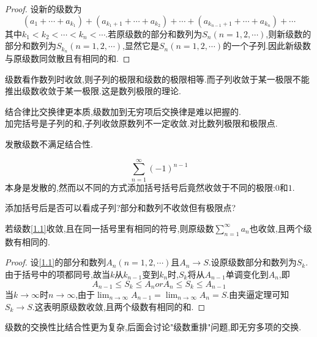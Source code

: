 \begin{proof}
    设新的级数为
    \begin{equation}\label{1.1}
        (a_1+\cdots+a_{k_1})+(a_{k_1+1}+\cdots+a_{k_2})+\cdots+(a_{k_{n-1}+1}+\cdots+a_{k_n})+\cdots
    \end{equation}
    其中$k_1<k_2<\cdots<k_n<\cdots.$若原级数的部分和数列为$S_n(n=1,2,\cdots)$,则新级数的部分和数列为$S_{k_n}(n=1,2,\cdots)$,显然它是$S_n(n=1,2,\cdots)$的一个子列.因此新级数与原级数同敛散且有相同的和.
\end{proof}

\begin{note}
    级数看作数列时收敛,则子列的极限和级数的极限相等.而子列收敛于某一极限不能推出级数收敛于某一极限.这是数列极限的理论.
\end{note}

\begin{remark}
    结合律比交换律更本质,级数加到无穷项后交换律是难以把握的.\\
    加完括号是子列的和,子列收敛原数列不一定收敛.对比数列极限和极限点.
\end{remark}

\begin{remark}
    发散级数不满足结合性.
    \begin{example}
        \[\sum_{n=1}^\infty(-1)^{n-1}\]
        本身是发散的,然而以不同的方式添加括号括号后竟然收敛于不同的极限:$0$和$1$.
    \end{example}
    \begin{note}
        添加括号后是否可以看成子列?部分和数列不收敛但有极限点?
    \end{note}
\end{remark}

\begin{proposition}
    若级数\ref{1.1}收敛,且在同一括号里有相同的符号,则原级数$\sum_{n=1}^\infty a_n$也收敛,且两个级数有相同的.
\end{proposition}

\begin{proof}
    设\ref{1.1}的部分和数列$A_n(n=1,2,\cdots)$且$A_n\to S$.设原级数部分和数列为$S_k$.由于括号中的项都同号,故当$k$从$k_{n-1}$变到$k_n$时,$S_k$将从$A_{n-1}$单调变化到$A_n$,即
    \[A_{n-1}\leqslant S_k\leqslant A_n or A_n\leqslant S_k\leqslant A_{n-1}\]
    当$k\to\infty$时$n\to\infty$,由于$\lim_{n\to\infty}A_{n-1}=\lim_{n\to\infty}A_n=S.$由夹逼定理可知$S_k\to S.$这表明原级数收敛,且两个级数有相同的和.
\end{proof}

级数的交换性比结合性更为复杂,后面会讨论"级数重排"问题,即无穷多项的交换.

